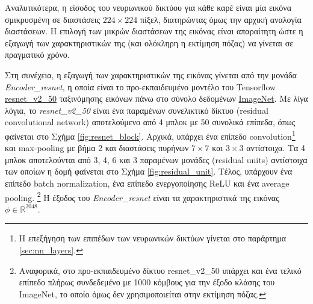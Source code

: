 Αναλυτικότερα, η είσοδος του νευρωνικού δικτύου για κάθε καρέ είναι μία εικόνα σμικρυσμένη σε διαστάσεις $224 \times 224$ πίξελ, διατηρώντας όμως την αρχική αναλογία διαστάσεων. Η επιλογή των μικρών διαστάσεων της εικόνας είναι απαραίτητη ώστε η εξαγωγή των χαρακτηριστικών της (και ολόκληρη η εκτίμηση πόζας) να γίνεται σε πραγματικό χρόνο.

Στη συνέχεια, η εξαγωγή των χαρακτηριστικών της εικόνας γίνεται από την μονάδα \textsl{Encoder\_resnet}, η οποία είναι το προ-εκπαιδευμένο μοντέλο του Tensorflow \href{https://github.com/tensorflow/models/blob/master/research/slim/nets/resnet\_v2.py}{resnet\_v2\_50} ταξινόμησης εικόνων πάνω στο σύνολο δεδομένων \href{https://www.image-net.org/}{ImageNet}. Με λίγα λόγια, το \textsl{resnet\_v2\_50} είναι ένα παραμένων συνελικτικό δίκτυο (residual convolutional network) αποτελούμενο από 4 μπλοκ με 50 συνολικά επίπεδα, όπως φαίνεται στο Σχήμα \ref{fig:resnet_block}. Αρχικά, υπάρχει ένα επίπεδο convolution\footnote{Η επεξήγηση των επιπέδων των νευρωνικών δικτύων γίνεται στο παράρτημα \ref{sec:nn_layers}.} και max-pooling με βήμα 2 και διαστάσεις πυρήνων $7 \times 7$ και $3 \times 3$ αντίστοιχα. Τα 4 μπλοκ αποτελούνται από 3, 4, 6 και 3 παραμένων μονάδες (residual units) αντίστοιχα των οποίων η δομή φαίνεται στο Σχήμα \ref{fig:residual_unit}. Τέλος, υπάρχουν ένα επίπεδο batch normalization, ένα επίπεδο ενεργοποίησης ReLU και ένα average pooling. \footnote{Αναφορικά, στο προ-εκπαιδευμένο δίκτυο resnet\_v2\_50 υπάρχει και ένα τελικό επίπεδο πλήρως συνδεδεμένο με 1000 κόμβους για την έξοδο κλάσης του ImageNet, το οποίο όμως δεν χρησιμοποιείται στην εκτίμηση πόζας.} Η έξοδος του \textsl{Encoder\_resnet} είναι τα χαρακτηριστικά της εικόνας $\phi \in \mathbb{R}^{2048}$.

